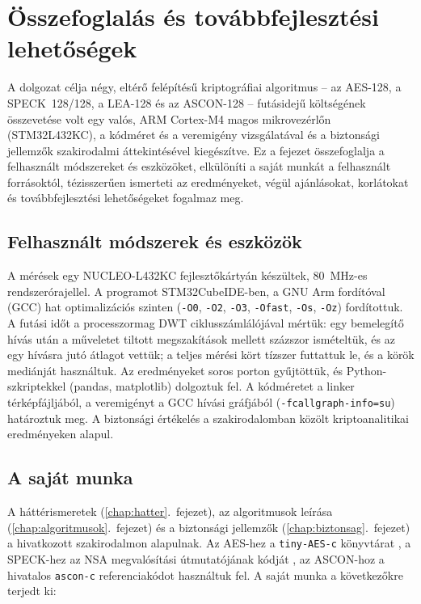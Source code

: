 \documentclass[a4paper,12pt]{report}
\theoremstyle{definition}
\theoremstyle{remark}
\begin{document}
\chapter{Összefoglalás és továbbfejlesztési lehetőségek}\label{chap:osszefoglalas}

A dolgozat célja négy, eltérő felépítésű kriptográfiai algoritmus -- az AES-128, a SPECK~128/128, a LEA-128 és az ASCON-128 -- futásidejű költségének összevetése volt egy valós, ARM Cortex-M4 magos mikrovezérlőn (STM32L432KC), a kódméret és a veremigény vizsgálatával és a biztonsági jellemzők szakirodalmi áttekintésével kiegészítve. Ez a fejezet összefoglalja a felhasznált módszereket és eszközöket, elkülöníti a saját munkát a felhasznált forrásoktól, tézisszerűen ismerteti az eredményeket, végül ajánlásokat, korlátokat és továbbfejlesztési lehetőségeket fogalmaz meg.

\section{Felhasznált módszerek és eszközök}

A mérések egy NUCLEO-L432KC fejlesztőkártyán készültek, 80~MHz-es rendszerórajellel. A programot STM32CubeIDE-ben, a GNU Arm fordítóval (GCC) hat optimalizációs szinten (\texttt{-O0}, \texttt{-O2}, \texttt{-O3}, \texttt{-Ofast}, \texttt{-Os}, \texttt{-Oz}) fordítottuk. A futási időt a processzormag DWT ciklusszámlálójával mértük: egy bemelegítő hívás után a műveletet tiltott megszakítások mellett százszor ismételtük, és az egy hívásra jutó átlagot vettük; a teljes mérési kört tízszer futtattuk le, és a körök mediánját használtuk. Az eredményeket soros porton gyűjtöttük, és Python-szkriptekkel (pandas, matplotlib) dolgoztuk fel. A kódméretet a linker térképfájljából, a veremigényt a GCC hívási gráfjából (\texttt{-fcallgraph-info=su}) határoztuk meg. A biztonsági értékelés a szakirodalomban közölt kriptoanalitikai eredményeken alapul.

\section{A saját munka}

A háttérismeretek (\ref{chap:hatter}.~fejezet), az algoritmusok leírása (\ref{chap:algoritmusok}.~fejezet) és a biztonsági jellemzők (\ref{chap:biztonsag}.~fejezet) a hivatkozott szakirodalmon alapulnak. Az AES-hez a \texttt{tiny-AES-c} könyvtárat \cite{TinyAES}, a SPECK-hez az NSA megvalósítási útmutatójának kódját \cite{Beaulieu2019}, az ASCON-hoz a hivatalos \texttt{ascon-c} referenciakódot \cite{AsconC} használtuk fel. A saját munka a következőkre terjedt ki:
\end{document}

